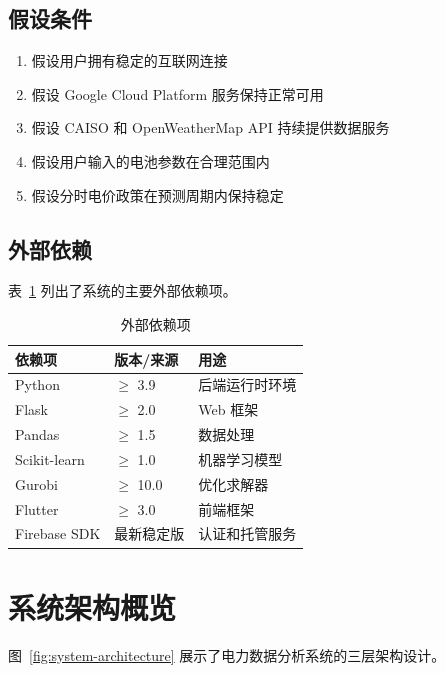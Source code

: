 \subsection{假设条件}

\begin{enumerate}
    \item 假设用户拥有稳定的互联网连接
    \item 假设 Google Cloud Platform 服务保持正常可用
    \item 假设 CAISO 和 OpenWeatherMap API 持续提供数据服务
    \item 假设用户输入的电池参数在合理范围内
    \item 假设分时电价政策在预测周期内保持稳定
\end{enumerate}

\subsection{外部依赖}

表~\ref{tab:dependencies} 列出了系统的主要外部依赖项。

\begin{table}[htbp]
    \centering
    \caption{外部依赖项}
    \label{tab:dependencies}
    \begin{tabularx}{\textwidth}{@{}l l X@{}}
        \toprule
        \textbf{依赖项} & \textbf{版本/来源} & \textbf{用途} \\
        \midrule
        Python       & $\geq$ 3.9     & 后端运行时环境     \\
        Flask        & $\geq$ 2.0     & Web 框架      \\
        Pandas       & $\geq$ 1.5     & 数据处理        \\
        Scikit-learn & $\geq$ 1.0     & 机器学习模型      \\
        Gurobi       & $\geq$ 10.0    & 优化求解器       \\
        Flutter      & $\geq$ 3.0     & 前端框架        \\
        Firebase SDK & 最新稳定版          & 认证和托管服务     \\
        \bottomrule
    \end{tabularx}
\end{table}

\section{系统架构概览}

图~\ref{fig:system-architecture} 展示了电力数据分析系统的三层架构设计。

